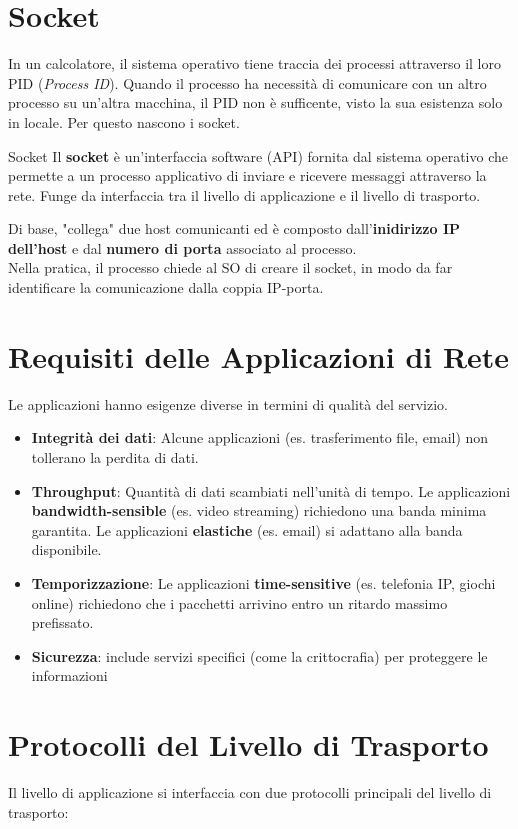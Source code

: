 \documentclass[12pt,a4paper,oneside]{book}
\begin{document}
\section{Socket}
In un calcolatore, il sistema operativo tiene traccia dei processi attraverso il loro PID (\textit{Process ID}). Quando il processo ha necessità di comunicare con un altro processo su un'altra macchina, il PID non è sufficente, visto la sua esistenza solo in locale. Per questo nascono i socket.
\begin{definition}{Socket}{}
Il \textbf{socket} è un'interfaccia software (API) fornita dal sistema operativo che permette a un processo applicativo di inviare e ricevere messaggi attraverso la rete. Funge da interfaccia tra il livello di applicazione e il livello di trasporto.
\end{definition}
Di base, "collega" due host comunicanti ed è composto dall'\textbf{inidirizzo IP dell'host} e dal \textbf{numero di porta} associato al processo.\\
Nella pratica, il processo chiede al SO di creare il socket, in modo da far identificare la comunicazione dalla coppia IP-porta.
\section{Requisiti delle Applicazioni di Rete}

Le applicazioni hanno esigenze diverse in termini di qualità del servizio.
\begin{itemize}
    \item \textbf{Integrità dei dati}: Alcune applicazioni (es. trasferimento file, email) non tollerano la perdita di dati.
    \item \textbf{Throughput}: Quantità di dati scambiati nell'unità di tempo. Le applicazioni \textbf{bandwidth-sensible} (es. video streaming) richiedono una banda minima garantita. Le applicazioni \textbf{elastiche} (es. email) si adattano alla banda disponibile.
    \item \textbf{Temporizzazione}: Le applicazioni \textbf{time-sensitive} (es. telefonia IP, giochi online) richiedono che i pacchetti arrivino entro un ritardo massimo prefissato.
    \item \textbf{Sicurezza}: include servizi specifici (come la crittocrafia) per proteggere le informazioni
\end{itemize}

\section{Protocolli del Livello di Trasporto}
Il livello di applicazione si interfaccia con due protocolli principali del livello di trasporto:
\end{document}
